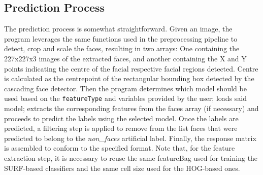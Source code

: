 \documentclass[11pt]{article}
\begin{document}
    \subsection{Prediction Process}
        The prediction process is somewhat straightforward. Given an image, the program leverages the same functions used in the preprocessing pipeline to detect, crop and scale the faces, resulting in two arrays: One containing the 227x227x3 images of the extracted faces, and another containing the X and Y points indicating the centre of the facial respective facial regions detected. Centre is calculated as the centrepoint of the rectangular bounding box detected by the cascading face detector.
        Then the program determines which model should be used based on the \texttt{featureType} and  variables provided by the user; loads said model; extracts the corresponding features from the faces array (if necessary) and proceeds to predict the labels using the selected model. Once the labels are predicted, a filtering step is applied to remove from the list faces that were predicted to belong to the \textit{non\_faces} artificial label. Finally, the response matrix is assembled to conform to the specified format. Note that, for the feature extraction step, it is necessary to reuse the same featureBag used for training the SURF-based classifiers and the same cell size used for the HOG-based ones.
\end{document}
